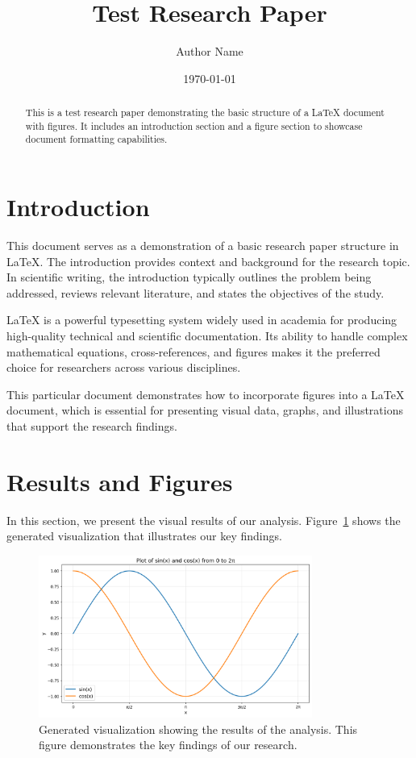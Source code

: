 \documentclass[12pt,a4paper]{article}
\title{Test Research Paper}
\author{Author Name}
\date{\today}
\begin{document}
\maketitle

\begin{abstract}
This is a test research paper demonstrating the basic structure of a LaTeX document with figures. It includes an introduction section and a figure section to showcase document formatting capabilities.
\end{abstract}

\section{Introduction}

This document serves as a demonstration of a basic research paper structure in LaTeX. The introduction provides context and background for the research topic. In scientific writing, the introduction typically outlines the problem being addressed, reviews relevant literature, and states the objectives of the study.

LaTeX is a powerful typesetting system widely used in academia for producing high-quality technical and scientific documentation. Its ability to handle complex mathematical equations, cross-references, and figures makes it the preferred choice for researchers across various disciplines.

This particular document demonstrates how to incorporate figures into a LaTeX document, which is essential for presenting visual data, graphs, and illustrations that support the research findings.

\section{Results and Figures}

In this section, we present the visual results of our analysis. Figure~\ref{fig:result} shows the generated visualization that illustrates our key findings.

\begin{figure}[htbp]
    \centering
    \includegraphics[width=0.8\textwidth]{figure_1_0.png}
    \caption{Generated visualization showing the results of the analysis. This figure demonstrates the key findings of our research.}
    \label{fig:result}
\end{figure}
\end{document}
